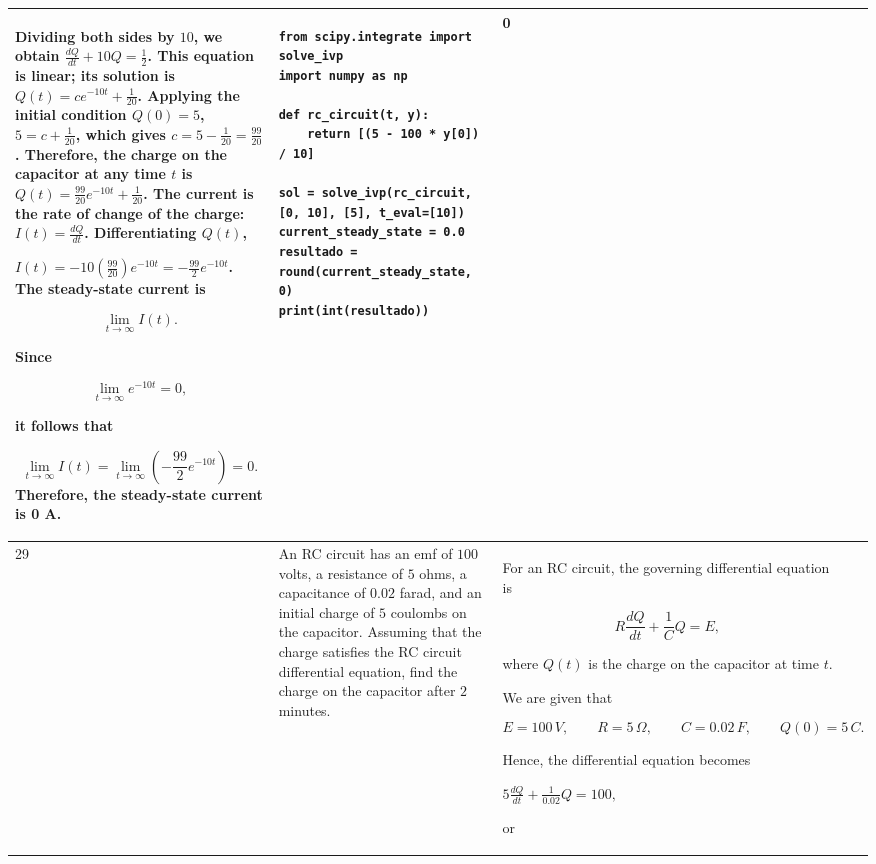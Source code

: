\documentclass[a4paper,12pt]{article}
\begin{document}
\begin{longtable}{|p{0.3cm}|p{}|p{10cm}|p{}|p{1.5cm}|}
Dividing both sides by $10$, we obtain  $\frac{dQ}{dt}+10Q=\frac{1}{2}$.
This equation is linear; its solution is $Q(t)=ce^{-10t}+\frac{1}{20}$.
Applying the initial condition $Q(0)=5$, $5=c+\frac{1}{20}$, which gives
$c=5-\frac{1}{20}
=\frac{99}{20}$.
Therefore, the charge on the capacitor at any time \(t\) is
$Q(t)=\frac{99}{20}e^{-10t}+\frac{1}{20}$.
The current is the rate of change of the charge:
$I(t)=\frac{dQ}{dt}$. Differentiating $Q(t)$,

$I(t)
=-10\left(\frac{99}{20}\right)e^{-10t}
=-\frac{99}{2}e^{-10t}$.
The steady-state current is

\[
\lim_{t\to\infty}I(t).
\]

Since

\[
\lim_{t\to\infty}e^{-10t}=0,
\]

it follows that

\[
\lim_{t\to\infty}I(t)
=\lim_{t\to\infty}\left(-\frac{99}{2}e^{-10t}\right)
=0.
\]
Therefore, the steady-state current is 0 A.


 &\begin{verbatim}
from scipy.integrate import solve_ivp
import numpy as np

def rc_circuit(t, y):
    return [(5 - 100 * y[0]) / 10]

sol = solve_ivp(rc_circuit, [0, 10], [5], t_eval=[10])
current_steady_state = 0.0
resultado = round(current_steady_state, 0)
print(int(resultado))\end{verbatim}& 0  \\ \hline 

 29           & An RC circuit has an emf of $100$ volts, a resistance of $5$ ohms, a capacitance of $0.02$ farad, and an initial charge of $5$ coulombs on the capacitor. Assuming that the charge satisfies the RC circuit differential equation, find the charge on the capacitor after $2$ minutes.


              & For an RC circuit, the governing differential equation is

$$
R\frac{dQ}{dt}+\frac{1}{C}Q=E,
$$

where \(Q(t)\) is the charge on the capacitor at time \(t\).

We are given that

$$
E=100\,V,\qquad
R=5\,\Omega,\qquad
C=0.02\,F,\qquad
Q(0)=5\,C.
$$

Hence, the differential equation becomes

$
5\frac{dQ}{dt}+\frac{1}{0.02}Q=100,
$

or


\end{longtable}
\end{document}
